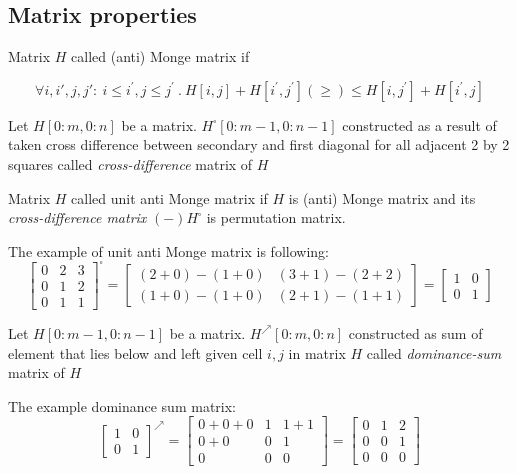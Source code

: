 \subsection{Matrix properties}

\begin{definition}
Matrix $H$ called (anti) Monge matrix if

\begin{displaymath}
  \forall i,i',j,j':\ i\leq i^{'}, j \leq j^{'}\ .\ H[i,j]+H[i^{'},j^{'}] (\geq)\leq H[i,j^{'}]+H[i^{'},j]
\end{displaymath}
\end{definition}

\begin{definition}
Let $H[0:m,0:n]$  be a matrix.
$H^{\square}[0:m-1,0:n-1]$ constructed as a result of taken cross difference between secondary and first diagonal for all adjacent 2 by 2 squares called \emph{cross-difference} matrix of  $H$
\end{definition}


\begin{definition}
Matrix $H$ called unit anti Monge matrix if $H$ is (anti) Monge matrix and its \emph{cross-difference matrix} $(-)H^{\square}$ is permutation matrix.
\end{definition}
The example of unit anti Monge matrix is following:
\begin{equation}
\begin{bmatrix}
0 & 2 & 3 \\
0 & 1 & 2 \\
0 & 1 & 1
\end{bmatrix} ^ { \square} =
\begin{bmatrix}
(2 + 0) - (1 + 0)  & (3 + 1) - (2 + 2)  \\
(1 + 0) - (1 + 0) &  (2 + 1) - (1 + 1) 
\end{bmatrix} = 
\begin{bmatrix}
1 & 0  \\
0 & 1 
\end{bmatrix} 
\end{equation}
 
\begin{definition}
Let $H[0:m-1,0:n-1]$  be a matrix.
$H^{\nearrow}[0:m,0:n]$ constructed as sum of element that lies below and left given cell $i,j$ in matrix $H$ called \emph{dominance-sum} matrix of $H$
\end{definition}

The example dominance sum matrix:
\begin{equation}
\begin{bmatrix}
1 & 0  \\
0 & 1 
\end{bmatrix}^{\nearrow} =
\begin{bmatrix}
0+0+0 & 1 & 1+1 \\
0+0 & 0 & 1 \\
0 & 0 & 0
\end{bmatrix} =
\begin{bmatrix}
0 & 1 & 2 \\
0 & 0 & 1 \\
0 & 0 & 0
\end{bmatrix}
\end{equation}

